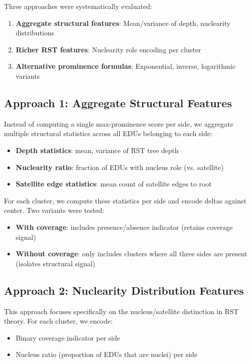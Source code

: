 \documentclass[12pt,a4paper]{article}
\begin{document}
Three approaches were systematically evaluated:
\begin{enumerate}
\item \textbf{Aggregate structural features}: Mean/variance of depth, nuclearity distributions
\item \textbf{Richer RST features}: Nuclearity role encoding per cluster
\item \textbf{Alternative prominence formulas}: Exponential, inverse, logarithmic variants
\end{enumerate}

\subsection{Approach 1: Aggregate Structural Features}

Instead of computing a single max-prominence score per side, we aggregate multiple structural
statistics across all EDUs belonging to each side:

\begin{itemize}
\item \textbf{Depth statistics}: mean, variance of RST tree depth
\item \textbf{Nuclearity ratio}: fraction of EDUs with nucleus role (vs. satellite)
\item \textbf{Satellite edge statistics}: mean count of satellite edges to root
\end{itemize}

For each cluster, we compute these statistics per side and encode deltas against center.
Two variants were tested:
\begin{itemize}
\item \textbf{With coverage}: includes presence/absence indicator (retains coverage signal)
\item \textbf{Without coverage}: only includes clusters where all three sides are present (isolates structural signal)
\end{itemize}

\subsection{Approach 2: Nuclearity Distribution Features}

This approach focuses specifically on the nucleus/satellite distinction in RST theory.
For each cluster, we encode:
\begin{itemize}
\item Binary coverage indicator per side
\item Nucleus ratio (proportion of EDUs that are nuclei) per side
\end{itemize}
\end{document}
